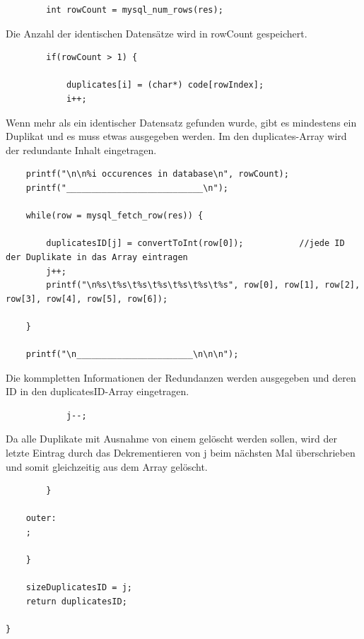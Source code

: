 \documentclass[12pt]{report}
\begin{document}
\begin{lstlisting}
        int rowCount = mysql_num_rows(res);
\end{lstlisting}

\noindent Die Anzahl der identischen Datensätze wird in rowCount gespeichert.\\


\begin{lstlisting}
        if(rowCount > 1) {

            duplicates[i] = (char*) code[rowIndex];
            i++;
\end{lstlisting}

\noindent Wenn mehr als ein identischer Datensatz gefunden wurde, gibt es mindestens ein Duplikat und es muss etwas ausgegeben werden. Im den duplicates-Array wird der redundante Inhalt eingetragen.\\

\begin{lstlisting}
    printf("\n\n%i occurences in database\n", rowCount);
    printf("___________________________\n");

    while(row = mysql_fetch_row(res)) {

        duplicatesID[j] = convertToInt(row[0]);           //jede ID der Duplikate in das Array eintragen
        j++;
        printf("\n%s\t%s\t%s\t%s\t%s\t%s\t%s", row[0], row[1], row[2], row[3], row[4], row[5], row[6]);

    }

    printf("\n_______________________\n\n\n");
\end{lstlisting}

\noindent Die kommpletten Informationen der Redundanzen werden ausgegeben und deren ID in den duplicatesID-Array eingetragen.\\


\begin{lstlisting}
            j--;
\end{lstlisting}

\noindent Da alle Duplikate mit Ausnahme von einem gelöscht werden sollen, wird der letzte Eintrag durch das Dekrementieren von j beim nächsten Mal überschrieben und somit gleichzeitig aus dem Array gelöscht.\\


\begin{lstlisting}
        }

    outer:
    ;

    }

    sizeDuplicatesID = j;
    return duplicatesID;
    
}
\end{lstlisting}
\end{document}
